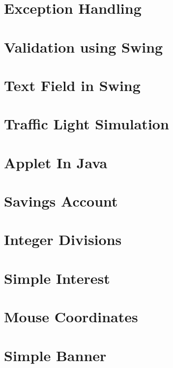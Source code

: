 \documentclass{article}
\begin{document}
\section{Exception Handling}

\newpage

\section{Validation using Swing}

\newpage

\section{Text Field in Swing}

\newpage

\section{Traffic Light Simulation}

\newpage

\section{Applet In Java}

\newpage

\section{Savings Account}

\newpage

\section{Integer Divisions}

\newpage

\section{Simple Interest}

\newpage

\section{Mouse Coordinates}

\newpage

\section{Simple Banner}

\newpage
\end{document}
